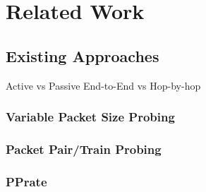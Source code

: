 \chapter{Related Work}

\section{Existing Approaches}
Active vs Passive
End-to-End vs Hop-by-hop

\subsection*{Variable Packet Size Probing}

\subsection*{Packet Pair/Train Probing}

\subsection*{PPrate}

